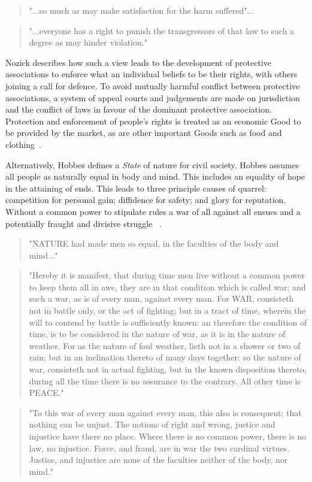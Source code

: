 \documentclass[11pt, oneside]{article}   	%
\begin{document}
\begin{quote}
"...so much as may make satisfaction for the harm suffered"...
\end{quote}
\begin{quote}
"...everyone has a right to punish the transgressors of that law to such a degree as may hinder violation."
\end{quote}

Nozick describes how such a view leads to the development of protective associations to enforce what an individual beliefs to be their rights, with others joining a call for defence.
To avoid mutually harmful conflict between protective associations, a system of appeal courts and judgements are made on jurisdiction and the conflict of laws in favour of the dominant protective association.
Protection and enforcement of people's rights is treated as an economic Good to be provided by the market, as are other important Goods such as food and clothing~\cite{rn1}.\

Alternatively, Hobbes defines a \emph{State} of nature for civil society.
Hobbes assumes all people as naturally equal in body and mind.
This includes an equality of hope in the attaining of ends.
This leads to three principle causes of quarrel: competition for personal gain; diffidence for safety; and glory for reputation. Without a common power to stipulate rules a war of all against all ensues and a potentially fraught and divisive struggle ~\cite{th1}.

\begin{quote}
"NATURE had made men so equal, in the faculties of the body and mind..."
\end{quote}
\begin{quote}
"Hereby it is manifest, that during time men live without a common power to keep them all in awe, they are in that condition which is called war; and such a war, as is of every man, against every man. For WAR, consisteth not in battle only, or the act of fighting; but in a tract of time, wherein the will to contend by battle is sufficiently known: an therefore the condition of time, is to be considered in the nature of war, as it is in the nature of weather. For as the nature of foul weather, lieth not in a shower or two of rain; but in an inclination thereto of many days together: so the nature of war, consisteth not in actual fighting, but in the known disposition thereto, during all the time there is no assurance to the contrary. All other time is PEACE."
\end{quote}
\begin{quote}
"To this war of every man against every man, this also is consequent; that nothing can be unjust. The notions of right and wrong, justice and injustice have there no place. Where there is no common power, there is no law, no injustice. Force, and fraud, are in war the two cardinal virtues. Justice, and injustice are none of the faculties neither of the body, nor mind."
\end{quote}
\end{document}
